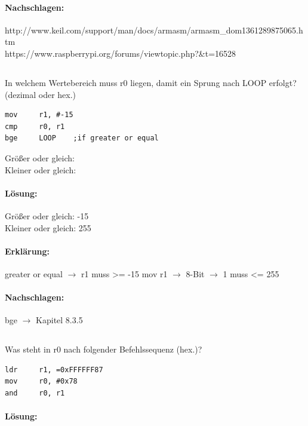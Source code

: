 \documentclass[12pt,twoside,a4paper]{article}
\begin{document}
\paragraph*{Nachschlagen:}
http://www.keil.com/support/man/docs/armasm/armasm_dom1361289875065.htm\\
https://www.raspberrypi.org/forums/viewtopic.php?&t=16528\\

\subsection{}
In welchem Wertebereich muss r0 liegen, damit ein Sprung nach LOOP erfolgt? (dezimal oder hex.)
\begin{lstlisting}
mov		r1, #-15
cmp		r0, r1
bge		LOOP	;if greater or equal
\end{lstlisting}

Größer oder gleich:\\
Kleiner oder gleich:\\

\paragraph*{Lösung:}
Größer oder gleich: -15\\
Kleiner oder gleich: 255\\

\paragraph*{Erklärung:}
greater or equal $\rightarrow$ r1 muss >= -15 
mov r1 $\rightarrow$ 8-Bit $\rightarrow$ 1 muss <= 255

\paragraph*{Nachschlagen:}
bge $\rightarrow$ Kapitel 8.3.5

\subsection{}
Was steht in r0 nach folgender Befehlssequenz (hex.)?
\begin{lstlisting}
ldr		r1, =0xFFFFFF87
mov		r0, #0x78
and		r0, r1
\end{lstlisting}

\paragraph*{Lösung:}
\end{document}
